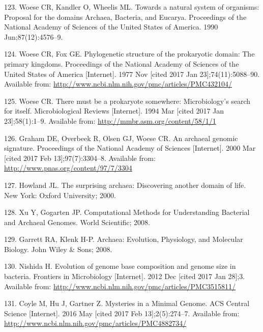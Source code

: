 \documentclass[12pt,twoside]{reedthesis}
\begin{document}
  \hypertarget{ref-woese_towards_1990}{}
  123. Woese CR, Kandler O, Wheelis ML. Towards a natural system of
  organisms: Proposal for the domains Archaea, Bacteria, and Eucarya.
  Proceedings of the National Academy of Sciences of the United States of
  America. 1990 Jun;87(12):4576--9.
  
  \hypertarget{ref-woese_phylogenetic_1977}{}
  124. Woese CR, Fox GE. Phylogenetic structure of the prokaryotic domain:
  The primary kingdoms. Proceedings of the National Academy of Sciences of
  the United States of America {[}Internet{]}. 1977 Nov {[}cited 2017 Jan
  23{]};74(11):5088--90. Available from:
  \url{http://www.ncbi.nlm.nih.gov/pmc/articles/PMC432104/}
  
  \hypertarget{ref-woese_there_1994}{}
  125. Woese CR. There must be a prokaryote somewhere: Microbiology's
  search for itself. Microbiological Reviews {[}Internet{]}. 1994 Mar
  {[}cited 2017 Jan 23{]};58(1):1--9. Available from:
  \url{http://mmbr.asm.org/content/58/1/1}
  
  \hypertarget{ref-graham_archaeal_2000}{}
  126. Graham DE, Overbeek R, Olsen GJ, Woese CR. An archaeal genomic
  signature. Proceedings of the National Academy of Sciences
  {[}Internet{]}. 2000 Mar {[}cited 2017 Feb 13{]};97(7):3304--8.
  Available from: \url{http://www.pnas.org/content/97/7/3304}
  
  \hypertarget{ref-howland_surprising_2000}{}
  127. Howland JL. The surprising archaea: Discovering another domain of
  life. New York: Oxford University; 2000.
  
  \hypertarget{ref-xu_computational_2008}{}
  128. Xu Y, Gogarten JP. Computational Methods for Understanding
  Bacterial and Archaeal Genomes. World Scientific; 2008.
  
  \hypertarget{ref-garrett_archaea_2008}{}
  129. Garrett RA, Klenk H-P. Archaea: Evolution, Physiology, and
  Molecular Biology. John Wiley \& Sons; 2008.
  
  \hypertarget{ref-nishida_evolution_2012}{}
  130. Nishida H. Evolution of genome base composition and genome size in
  bacteria. Frontiers in Microbiology {[}Internet{]}. 2012 Dec {[}cited
  2017 Jan 28{]};3. Available from:
  \url{http://www.ncbi.nlm.nih.gov/pmc/articles/PMC3515811/}
  
  \hypertarget{ref-coyle_mysteries_2016}{}
  131. Coyle M, Hu J, Gartner Z. Mysteries in a Minimal Genome. ACS
  Central Science {[}Internet{]}. 2016 May {[}cited 2017 Feb
  13{]};2(5):274--7. Available from:
  \url{http://www.ncbi.nlm.nih.gov/pmc/articles/PMC4882734/}
  
\end{document}
